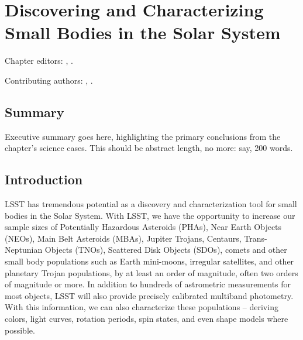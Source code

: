 \chapter[Solar System]{Discovering and Characterizing Small Bodies in
  the Solar System}
\def\chpname{solarsystem}\label{chp:\chpname}

Chapter editors:
,
.

Contributing authors:
,
.

\section*{Summary}

Executive summary goes here, highlighting the primary conclusions from
the chapter's science cases. This should be abstract length, no more:
say, 200 words.


\section{Introduction}
\label{sec:\chpname:intro}

LSST has tremendous potential as a discovery and characterization tool
for small bodies in the Solar System. With LSST, we have the
opportunity to increase our sample sizes of Potentially Hazardous
Asteroids (PHAs), Near Earth Objects (NEOs), Main Belt Asteroids
(MBAs), Jupiter Trojans, Centaurs, Trans-Neptunian Objects (TNOs),
Scattered Disk Objects (SDOs), comets and other small body populations
such as Earth mini-moons, irregular satellites, and other planetary
Trojan populations, by at least an order of
magnitude, often two orders of magnitude or more. In addition to
hundreds of astrometric measurements for most objects, LSST will also
provide precisely calibrated multiband photometry. With this
information, we can also characterize these populations -- deriving
colors, light curves, rotation periods, spin states, and even shape
models where possible.

